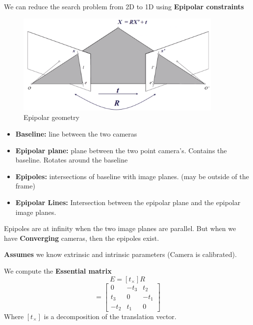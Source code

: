 \documentclass[a4paper]{article}
\begin{document}
We can reduce the search problem from 2D to 1D using \textbf{Epipolar constraints} 
\begin{figure}[H]
\centering
\includegraphics[width=0.9\textwidth]{figures/Epipolar_geomtry.png }
\caption{Epipolar geometry}
\label{fig:Epipolar_geomtry}
\end{figure} 

\begin{itemize}
	\item \textbf{Baseline:} line between the two cameras
	\item \textbf{Epipolar plane:} plane between the two point camera's. Contains the baseline. Rotates around the baseline
	\item \textbf{Epipoles:} intersections of baseline with image planes. (may be outside of the frame)
	\item \textbf{Epipolar Lines:} Intersection between the epipolar plane and the epipolar image planes. 
\end{itemize}

Epipoles are at infinity when the two image planes are parallel. But when we have \textbf{Converging } cameras, then the epipoles exist. 

\textbf{Assumes} we know extrinsic and intrinsic parameters (Camera is calibrated). 

We compute the \textbf{Essential matrix} 
\begin{equation}
	E = [t_{\times}]R
\end{equation}
\begin{equation}
	[t_{\times}] = \begin{bmatrix}
	0 & -t_3 & t_2\\
	t_3 & 0 & -t_1\\
	-t_2 & t_1 & 0
	\end{bmatrix}
\end{equation}
Where $ [t_{\times}] $ is a decomposition of the translation vector.
	 
\end{document}
